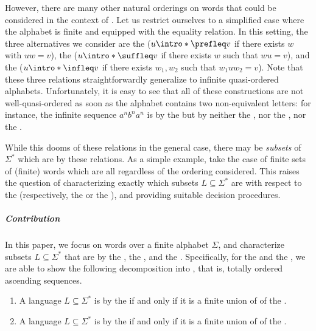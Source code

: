 \AP However, there are many other natural orderings on words that could be
considered in the context of . Let us restrict
ourselves to a simplified case where the alphabet is finite and equipped with
the equality relation. In this setting, the three alternatives we consider are
the  ($u \intro*\prefleq v$ if there exists $w$ with $uw
= v$), the  ($u \intro*\suffleq v$ if there exists $w$
such that $wu = v$), and the  ($u \intro*\infleq v$ if
there exists $w_1,w_2$ such that $w_1 u w_2 = v$). Note that these three
relations straightforwardly generalize to infinite quasi-ordered alphabets.
Unfortunately, it is easy to see that all of these constructions are not
well-quasi-ordered as soon as the alphabet contains two non-equivalent letters:
for instance, the infinite sequence $a^n b^n a^n$ is  by
the  but by neither the , nor the
, nor the .


\AP While this dooms  of these relations in the general case, there may be
\emph{subsets} of $\Sigma^*$ which are  by these
relations. As a simple example, take the case of finite sets of (finite) words
which are all  regardless of the ordering considered.
This raises the question of characterizing exactly which subsets $L \subseteq \Sigma^*$
are  with respect to the 
(respectively, the  or the ), and
providing suitable decision procedures.



\subparagraph{Contribution} In this paper, we focus on words over a finite
alphabet $\Sigma$, and characterize subsets $L \subseteq \Sigma^*$ that are
 by the , the ,
and the . Specifically, for the  and the , we are able to show the following decomposition into , that is, totally ordered ascending sequences.

{
\renewcommand{\labelenumi}{R\arabic{enumi}}
\begin{enumerate}
	\item A language $L \subseteq \Sigma^*$ is  by the  if and only if it is a finite union of  of the .
	\item A language $L \subseteq \Sigma^*$ is  by the  if and only if it is a finite union of  of the .
\end{enumerate}
}

